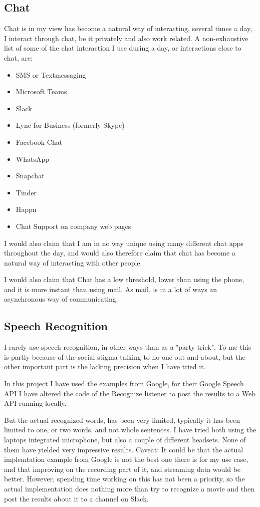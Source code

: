 \documentclass[11pt,fleqn]{book} %
\begin{document}
\subsection{Chat}
Chat is in my view has become a natural way of interacting, several times a day, I interact through chat, be it privately and also work related. A non-exhaustive list of some of the chat interaction I use during a day, or interactions close to chat, are:
\begin{itemize}
\item SMS or Textmessaging
\item Microsoft Teams
\item Slack
\item Lync for Business (formerly Skype)
\item Facebook Chat
\item WhatsApp
\item Snapchat 
\item Tinder
\item Happn
\item Chat Support on company web pages
\end{itemize}

I would also claim that I am in no way unique using many different chat apps throughout the day, and would also therefore claim that chat has become a natural way of interacting with other people.

I would also claim that Chat has a low threshold, lower than using the phone, and it is more instant than using mail. As mail, is in a lot of ways an asynchronous way of communicating.

\subsection{Speech Recognition}
I rarely use speech recognition, in other ways than as a "party trick". To me this is partly because of the social stigma talking to no one out and about, but the other important part is the lacking precision when I have tried it.

In this project I have used the examples from Google, for their Google Speech API
\cite{GoogleCloudPlatformSpeechPlatform}
I have altered the code of the Recognize listener to post the results to a Web API running locally.

But the actual recognized words, has been very limited, typically it has been limited to one, or two words, and not whole sentences.
I have tried both using the laptops integrated microphone, but also a couple of different headsets. None of them have yielded very impressive results.
Caveat: It could be that the actual implemtation example from Google is not the best one there is for my use case, and that improving on the recording part of it, and streaming data would be better. However, spending time working on this has not been a priority, so the actual implementation does nothing more than try to recognize a movie and then post the results about it to a channel on Slack.
\end{document}
